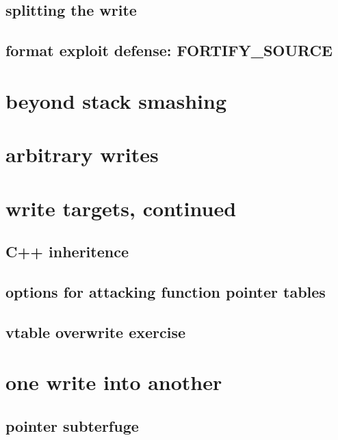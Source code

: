 \subsection{splitting the write}


\subsection{format exploit defense: FORTIFY\_SOURCE}


\section{beyond stack smashing}


\section{arbitrary writes}


\section{write targets, continued}

\subsection{C++ inheritence}


\subsection{options for attacking function pointer tables}


\subsection{vtable overwrite exercise}


\section{one write into another}

\subsection{pointer subterfuge}


